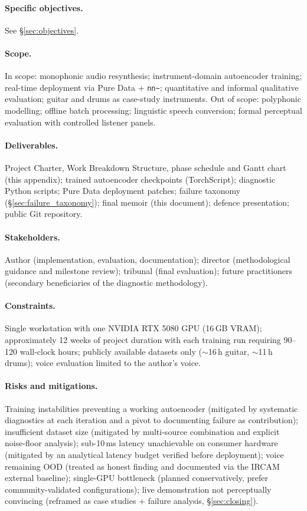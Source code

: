 \documentclass[a4paper,11pt,oneside,openany]{book}
\begin{document}
\begin{appendices}
\paragraph{Specific objectives.} See \S\ref{sec:objectives}.

\paragraph{Scope.} In scope: monophonic audio resynthesis; instrument-domain autoencoder training; real-time deployment via Pure Data $+$ \texttt{nn\textasciitilde}; quantitative and informal qualitative evaluation; guitar and drums as case-study instruments. Out of scope: polyphonic modelling; offline batch processing; linguistic speech conversion; formal perceptual evaluation with controlled listener panels.

\paragraph{Deliverables.} Project Charter, Work Breakdown Structure, phase schedule and Gantt chart (this appendix); trained autoencoder checkpoints (TorchScript); diagnostic Python scripts; Pure Data deployment patches; failure taxonomy (\S\ref{sec:failure_taxonomy}); final memoir (this document); defence presentation; public Git repository.

\paragraph{Stakeholders.} Author (implementation, evaluation, documentation); director (methodological guidance and milestone review); tribunal (final evaluation); future practitioners (secondary beneficiaries of the diagnostic methodology).

\paragraph{Constraints.} Single workstation with one NVIDIA RTX 5080 GPU (16\,GB VRAM); approximately 12 weeks of project duration with each training run requiring 90--120 wall-clock hours; publicly available datasets only ($\sim$16\,h guitar, $\sim$11\,h drums); voice evaluation limited to the author's voice.

\paragraph{Risks and mitigations.} Training instabilities preventing a working autoencoder (mitigated by systematic diagnostics at each iteration and a pivot to documenting failure as contribution); insufficient dataset size (mitigated by multi-source combination and explicit noise-floor analysis); sub-10\,ms latency unachievable on consumer hardware (mitigated by an analytical latency budget verified before deployment); voice remaining OOD (treated as honest finding and documented via the IRCAM external baseline); single-GPU bottleneck (planned conservatively, prefer community-validated configurations); live demonstration not perceptually convincing (reframed as case studies + failure analysis, \S\ref{sec:closing}).


\end{appendices}
\end{document}
